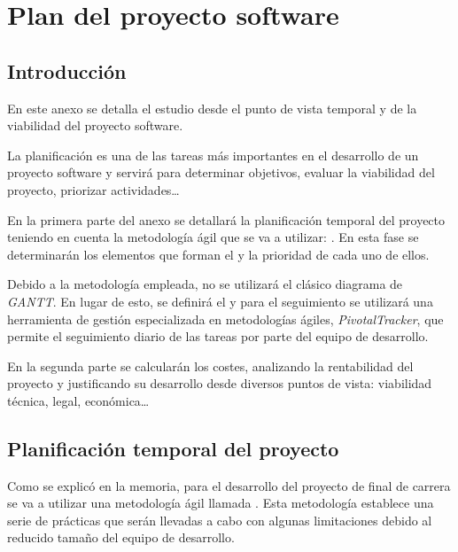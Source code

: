 \chapter{Plan del proyecto software}

\section{Introducción}
En este anexo se detalla el estudio desde el punto de vista temporal y de la viabilidad del proyecto software.

La planificación es una de las tareas más importantes en el desarrollo de un proyecto software y servirá para determinar objetivos, evaluar la viabilidad del proyecto, priorizar actividades\dots

En la primera parte del anexo se detallará la planificación temporal del proyecto teniendo en cuenta la metodología ágil que se va a utilizar: \scrum{}. En esta fase se determinarán los elementos que forman el \productbacklog{} y la prioridad de cada uno de ellos.

Debido a la metodología empleada, no se utilizará el clásico diagrama de \textit{GANTT}. En lugar de esto, se definirá el \productbacklog{} y para el seguimiento se utilizará una herramienta de gestión especializada en metodologías ágiles, \textit{PivotalTracker}, que permite el seguimiento diario de las tareas por parte del equipo de desarrollo.

En la segunda parte se calcularán los costes, analizando la rentabilidad del proyecto y justificando su desarrollo desde diversos puntos de vista: viabilidad técnica, legal, económica\dots
\newpage



\section{Planificación temporal del proyecto} 
Como se explicó en la memoria, para el desarrollo del proyecto de final de carrera se va a utilizar una metodología ágil llamada \scrum{}. Esta metodología establece una serie de prácticas que serán llevadas a cabo con algunas limitaciones debido al reducido tamaño del equipo de desarrollo.

